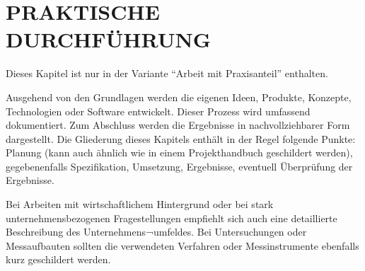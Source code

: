 \documentclass[./\jobname.tex]{subfiles}
\begin{document}
%
%
%
\section{PRAKTISCHE DURCHFÜHRUNG}\label{chap: Use-Case berscheibung}\raggedbottom%
%
Dieses Kapitel ist nur in der Variante \enquote{Arbeit mit Praxisanteil} enthalten.\par
%
Ausgehend von den Grundlagen werden die eigenen Ideen, Produkte, Konzepte, Technologien oder Software entwickelt. Dieser Prozess wird umfassend dokumentiert. Zum Abschluss werden die Ergebnisse in nachvollziehbarer Form dargestellt. Die Gliederung dieses Kapitels enthält in der Regel folgende Punkte: Planung (kann auch ähnlich wie in einem Projekthandbuch geschildert werden), gegebenenfalls Spezifikation, Umsetzung, Ergebnisse, eventuell Überprüfung der Ergebnisse.\par
%
Bei Arbeiten mit wirtschaftlichem Hintergrund oder bei stark unternehmensbezogenen Fragestellungen empfiehlt sich auch eine detaillierte Beschreibung des Unternehmens¬umfeldes. Bei Untersuchungen oder Messaufbauten sollten die verwendeten Verfahren oder Messinstrumente ebenfalls kurz geschildert werden.

%
\end{document}
